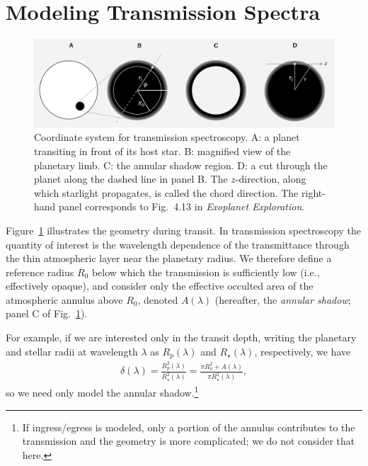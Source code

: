 \section{Modeling Transmission Spectra}

\begin{figure}[htb]
\begin{center}
\includegraphics[width=0.85\linewidth]{fig/transmission_chord.PNG}
\caption{Coordinate system for transmission spectroscopy. A: a planet transiting in front of its host star. B: magnified view of the planetary limb. C: the annular shadow region. D: a cut through the planet along the dashed line in panel B. The $z$-direction, along which starlight propagates, is called the chord direction. The right-hand panel corresponds to Fig.~4.13 in \emph{Exoplanet Exploration}. \label{fig:transmission_chord}}
\end{center}
\end{figure}

Figure~\ref{fig:transmission_chord} illustrates the geometry during transit.
In transmission spectroscopy the quantity of interest is the wavelength dependence of the transmittance through the thin atmospheric layer near the planetary radius. We therefore define a reference radius $R_0$ below which the transmission is sufficiently low (i.e., effectively opaque), and consider only the effective occulted area of the atmospheric annulus above $R_0$, denoted $A(\lambda)$ (hereafter, the \emph{annular shadow}; panel C of Fig.~\ref{fig:transmission_chord}).

For example, if we are interested only in the transit depth, writing the planetary and stellar radii at wavelength $\lambda$ as $R_p(\lambda)$ and $R_\star(\lambda)$, respectively, we have
\begin{align}
\delta(\lambda) = \frac{R_p^2(\lambda)}{R_\star^2(\lambda)}  = \frac{\pi R_0^2 + A(\lambda)}{\pi R_\star^2(\lambda)} ,
\end{align}
so we need only model the annular shadow.\footnote{If ingress/egress is modeled, only a portion of the annulus contributes to the transmission and the geometry is more complicated; we do not consider that here.}

